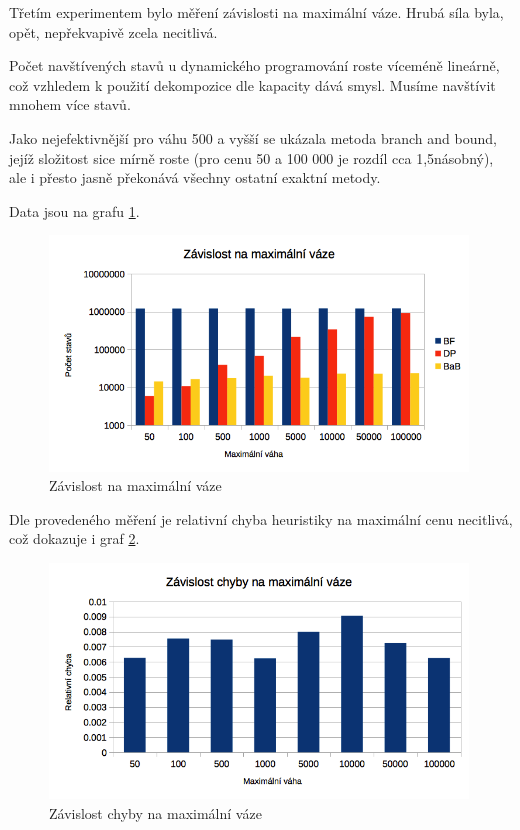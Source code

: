 \documentclass[a4paper]{article}
\begin{document}
		Třetím experimentem bylo měření závislosti na maximální váze. Hrubá síla byla, opět, nepřekvapivě zcela necitlivá.
		
		Počet navštívených stavů u dynamického programování roste víceméně lineárně, což vzhledem k použití dekompozice dle kapacity dává smysl. Musíme navštívit mnohem více stavů.
		
		Jako nejefektivnější pro váhu 500 a vyšší se ukázala metoda branch and bound, jejíž složitost sice mírně roste (pro cenu 50 a 100 000 je rozdíl cca 1,5násobný), ale i přesto jasně překonává všechny ostatní exaktní metody.
		
		Data jsou na grafu \ref{state-maxWeight}.
		
		\begin{figure}[h]\centering
			\includegraphics[width=0.99\textwidth]{states-maxWeight.png} 
			\caption{Závislost na maximální váze}
			\label{state-maxWeight}
		\end{figure}
		
		Dle provedeného měření je relativní chyba heuristiky na maximální cenu necitlivá, což dokazuje i graf \ref{err-maxWeight}.
	
		\begin{figure}[h]\centering
			\includegraphics[width=0.99\textwidth]{err-maxWeight.png} 
			\caption{Závislost chyby na maximální váze}
			\label{err-maxWeight}
		\end{figure}
		
\end{document}
